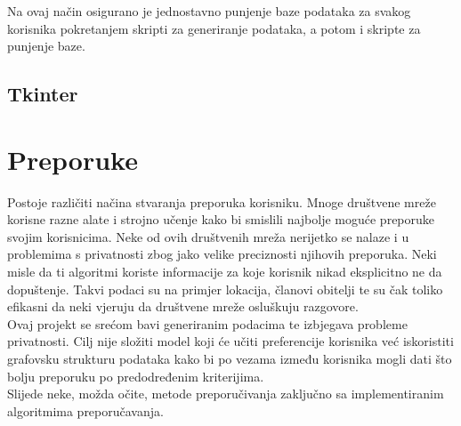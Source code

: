 \documentclass[titlepage, 12pt]{scrartcl}
\begin{document}
Na ovaj način osigurano je jednostavno punjenje baze podataka za svakog korisnika pokretanjem skripti za generiranje podataka, a potom i skripte za punjenje baze.
\subsection{Tkinter}
\newpage

\section{Preporuke}
Postoje različiti načina stvaranja preporuka korisniku. Mnoge društvene mreže korisne razne alate i strojno učenje kako bi smislili najbolje moguće preporuke svojim korisnicima.
Neke od ovih društvenih mreža nerijetko se nalaze i u problemima s privatnosti zbog jako velike preciznosti njihovih preporuka.
Neki misle da ti algoritmi koriste informacije za koje korisnik nikad eksplicitno ne da dopuštenje. Takvi podaci su na primjer lokacija, članovi obitelji te su čak toliko efikasni da neki vjeruju da društvene mreže osluškuju razgovore. \\
Ovaj projekt se srećom bavi generiranim podacima te izbjegava probleme privatnosti. Cilj nije složiti model koji će učiti preferencije korisnika već iskoristiti grafovsku strukturu podataka kako bi po vezama između korisnika mogli dati što bolju preporuku po predodređenim kriterijima. \\
Slijede neke, možda očite, metode preporučivanja zaključno sa implementiranim algoritmima preporučavanja.
\end{document}
